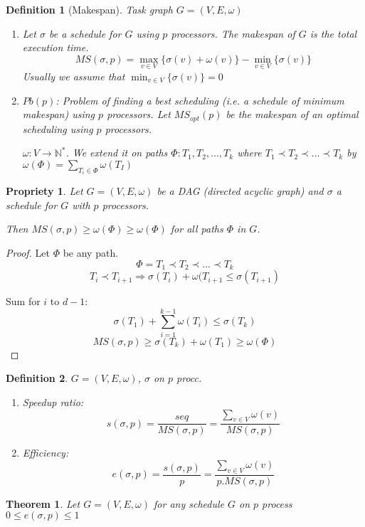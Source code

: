\documentclass{article}
\newtheorem{thm}{Theorem}
\newtheorem{prop}{Propriety}
\newtheorem{defi}{Definition}
\begin{document}
\begin{defi}[Makespan]
Task graph $G=(V,E,\omega )$
\begin{enumerate}
\item Let $\sigma$ be a schedule for $G$ using $p$ processors. The makespan of $G$ is the total execution time.
\[MS(\sigma, p) = \max_{v\in V} \{\sigma (v) + \omega (v) \} - \min_{v\in V}\{\sigma ( v)\}\]
Usually we assume that $\min_{v\in V}\{\sigma ( v)\}=0$

\item $Pb(p)$: Problem of finding a best scheduling (i.e. a schedule of minimum makespan) using $p$ processors. Let $MS_{opt}(p)$ be the makespan of an optimal scheduling using $p$ processors.

$\omega : V \to \mathbb{N}^*$. We extend it on paths $\Phi : T_1,T_2,...,T_k$ where $T_1 \prec T_2 \prec ... \prec T_k$ by $\omega ( \Phi) =\sum_{T_i \in \Phi} \omega (T_I)$
\end{enumerate}
\end{defi}

\begin{prop}
Let $G=(V,E,\omega)$ be a DAG (directed acyclic graph) and $\sigma$ a schedule for $G$ with $p$ processors.

Then $MS(\sigma, p)\geq \omega (\Phi) \geq \omega (\Phi)$ for all paths $\Phi$ in $G$.
\end{prop}

\begin{proof}
Let $\Phi$ be any path. 
\[\Phi=T_1 \prec T_2 \prec ... \prec T_k\]
\[T_i \prec T_{i+1} \Rightarrow \sigma (T_i) + \omega ( T_{i+1} \leq \sigma (T_{i+1})\]

Sum for $i$ to $d-1$:
\[\sigma (T_1) + \sum_{i=1}^{k-1} \omega(T_i) \leq \sigma(T_k) \]
\[MS(\sigma, p) \geq \sigma (T_k) + \omega (T_1) \geq \omega (\Phi)\]
\end{proof}


\begin{defi}
$G=(V,E,\omega)$, $\sigma$ on $p$ procc.
\begin{enumerate}
\item Speedup ratio:
\[s(\sigma, p)=\frac{seq}{MS(\sigma,p)} = \frac{\sum_{v\in V} \omega (v)}{MS(\sigma,p)}\]
\item Efficiency:
\[e(\sigma, p)=\frac{s(\sigma, p)}{p} = \frac{\sum_{v\in V} \omega (v)}{p.MS(\sigma,p)}\]
\end{enumerate}
\end{defi}


\begin{thm}
Let $G=(V,E,\omega)$ for any schedule $G$ on $p$ process $0\leq e(\sigma, p) \leq 1$
\end{thm}
\end{document}
